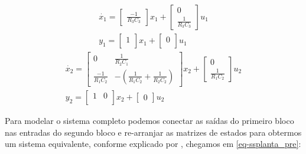 \documentclass[
	12pt,				%
	article,			%
	openright,			%
	oneside,
	a4paper,			%
	chapter=TITLE,		%
	section=TITLE,		%
	english,			%
	french,				%
	spanish,			%
	brazil,				%
]{abntex2}
\begin{document}
        	\begin{eqnarray}
        		\nonumber
                \dot{x_1} = 
                \begin{bmatrix}
                    \frac{-1}{R_3 C_3}
                \end{bmatrix}x_1
                +
                \begin{bmatrix}
                    0 \\
                    \frac{1}{R_3 C_3}
                \end{bmatrix}u_1 \\
                \label{eq-ssb1}
                    y_1 = 
                \begin{bmatrix}
                    1 \\
                \end{bmatrix}x_1
                +
                \begin{bmatrix}
                    0 \\
                \end{bmatrix}u_1
            \end{eqnarray}
            \begin{eqnarray}
        		\nonumber
        		\dot{x_2} = 
                \begin{bmatrix}
                    0 & \frac{1}{R_2 C_1} \\
                    \frac{-1}{R_1 C_2} & -\left( \frac{1}{R_1 C_2} + \frac{1}{R_2 C_2} \right)
                \end{bmatrix}x_2
                +
                \begin{bmatrix}
                    0 \\
                    \frac{1}{R_1 C_2}
                \end{bmatrix}u_2 \\
                \label{eq-ssb2}
                y_2 = 
                \begin{bmatrix}
                    1 & 0 \\
                \end{bmatrix}x_2
                +
                \begin{bmatrix}
                    0
                \end{bmatrix}u_2
        	\end{eqnarray}
        	
        	Para modelar o sistema completo podemos conectar as saídas do primeiro bloco nas entradas do segundo bloco e re-arranjar as matrizes de estados para obtermos um sistema equivalente, conforme explicado por , chegamos em \ref{eq-ssplanta_pre}:
        	
\end{document}
